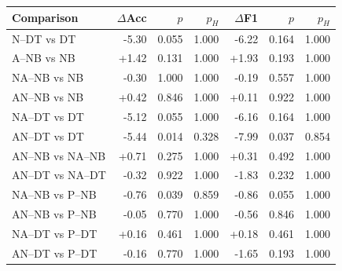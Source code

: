 \begin{tabular}{lrrrrrr}
\toprule
Comparison & $\Delta$Acc & $p$ & $p_{H}$ & $\Delta$F1 & $p$ & $p_{H}$ \\
\midrule
N--DT vs DT & -5.30 & 0.055 & 1.000 & -6.22 & 0.164 & 1.000 \\
A--NB vs NB & +1.42 & 0.131 & 1.000 & +1.93 & 0.193 & 1.000 \\
NA--NB vs NB & -0.30 & 1.000 & 1.000 & -0.19 & 0.557 & 1.000 \\
AN--NB vs NB & +0.42 & 0.846 & 1.000 & +0.11 & 0.922 & 1.000 \\
NA--DT vs DT & -5.12 & 0.055 & 1.000 & -6.16 & 0.164 & 1.000 \\
AN--DT vs DT & -5.44 & 0.014 & 0.328 & -7.99 & 0.037 & 0.854 \\
AN--NB vs NA--NB & +0.71 & 0.275 & 1.000 & +0.31 & 0.492 & 1.000 \\
AN--DT vs NA--DT & -0.32 & 0.922 & 1.000 & -1.83 & 0.232 & 1.000 \\
NA--NB vs P--NB & -0.76 & 0.039 & 0.859 & -0.86 & 0.055 & 1.000 \\
AN--NB vs P--NB & -0.05 & 0.770 & 1.000 & -0.56 & 0.846 & 1.000 \\
NA--DT vs P--DT & +0.16 & 0.461 & 1.000 & +0.18 & 0.461 & 1.000 \\
AN--DT vs P--DT & -0.16 & 0.770 & 1.000 & -1.65 & 0.193 & 1.000 \\
\bottomrule
\end{tabular}
